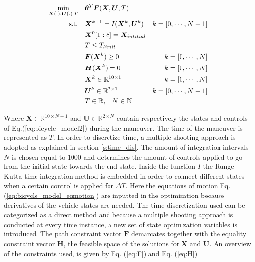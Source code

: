 
\begin{equation}\label{opt:basic_opti_w}
\begin{aligned}
\min_{\bm{X}(.),\bm{U}(.), T} \quad &  \bm{\theta}^T\bm{F}(\bm{X},\bm{U}, T) \\
\textrm{s.t.} \quad & \bm{X}^{k+1} = I(\bm{X}^{k}, \bm{U}^{k}) & k = [0,\cdots, N-1]\\
& \bm{X}^{0}[1:8]= \bm{X}_{intitial} \\
& T \leq T_{limit}\\
& \bm{F}(\bm{X}^{k}) \geq 0	& k = [0,\cdots, N]\\
& \bm{H}(\bm{X}^{k}) = 0	& k = [0,\cdots, N]\\
& \bm{X}^{k}\in \mathbb{R}^{10\times 1}  & k = [0,\cdots, N]\\
& \bm{U}^{k}\in \mathbb{R}^{2\times 1} \hspace{3 mm} & k = [0,\cdots, N-1]\\
& T \in \mathbb{R},\hspace{3 mm} N \in \mathbb{N}
\end{aligned}
\end{equation}

Where $\bm{X} \in \mathbb{R}^{10\times N+1}$ and $\bm{U}\in \mathbb{R}^{2\times N}$ contain respectively the states and controls of Eq.(\ref{eq:bicycle_model2}) during the maneuver. The time of the maneuver is represented as $T$. In order to discretize time, a multiple shooting approach is adopted as explained in section \ref{s:time_dis}. The amount of integration intervals $N$ is chosen equal to $1000$ and determines the  amount of controls applied to go from the initial state towards the end state. 
Inside the function $I$ the Runge-Kutta time integration method is embedded in order to connect different states when a certain control is applied for $\Delta T$. Here the equations of motion Eq. (\ref{eq:bicycle_model_eqmotion}) are inputted in the optimization because derivatives of the vehicle states are needed. The time discretization used can be categorized as a direct method and because a multiple shooting approach is conducted at every time instance, a new set of state optimization variables is introduced. The path constraint vector $\bm{F}$ demarcates together with the equality constraint vector $\bm{H}$, the feasible space of the solutions for $\bm{X}$ and $\bm{U}$. An overview of the constraints used, is given by Eq. (\ref{eq:F}) and Eq. (\ref{eq:H})

